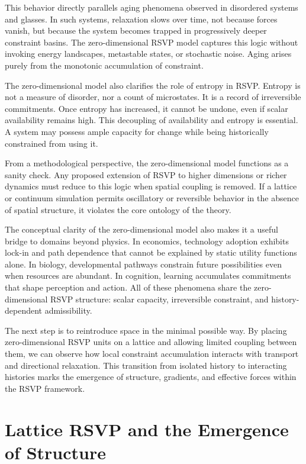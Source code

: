 \documentclass[11pt,oneside]{book}
\begin{document}
This behavior directly parallels aging phenomena observed in disordered systems and glasses. In such systems, relaxation slows over time, not because forces vanish, but because the system becomes trapped in progressively deeper constraint basins. The zero-dimensional RSVP model captures this logic without invoking energy landscapes, metastable states, or stochastic noise. Aging arises purely from the monotonic accumulation of constraint.

The zero-dimensional model also clarifies the role of entropy in RSVP. Entropy is not a measure of disorder, nor a count of microstates. It is a record of irreversible commitments. Once entropy has increased, it cannot be undone, even if scalar availability remains high. This decoupling of availability and entropy is essential. A system may possess ample capacity for change while being historically constrained from using it.

From a methodological perspective, the zero-dimensional model functions as a sanity check. Any proposed extension of RSVP to higher dimensions or richer dynamics must reduce to this logic when spatial coupling is removed. If a lattice or continuum simulation permits oscillatory or reversible behavior in the absence of spatial structure, it violates the core ontology of the theory.

The conceptual clarity of the zero-dimensional model also makes it a useful bridge to domains beyond physics. In economics, technology adoption exhibits lock-in and path dependence that cannot be explained by static utility functions alone. In biology, developmental pathways constrain future possibilities even when resources are abundant. In cognition, learning accumulates commitments that shape perception and action. All of these phenomena share the zero-dimensional RSVP structure: scalar capacity, irreversible constraint, and history-dependent admissibility.

The next step is to reintroduce space in the minimal possible way. By placing zero-dimensional RSVP units on a lattice and allowing limited coupling between them, we can observe how local constraint accumulation interacts with transport and directional relaxation. This transition from isolated history to interacting histories marks the emergence of structure, gradients, and effective forces within the RSVP framework.

\chapter{Lattice RSVP and the Emergence of Structure}
\end{document}
